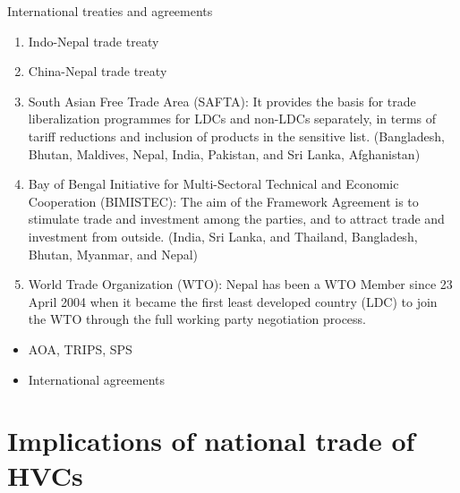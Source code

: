 \documentclass[12pt,ignorenonframetext,aspectratio=169]{beamer}
\providecommand{\tightlist}{%
  \setlength{\itemsep}{0pt}\setlength{\parskip}{0pt}}
\begin{document}
\begin{frame}{International treaties and agreements}
\protect\hypertarget{international-treaties-and-agreements}{}
\begin{enumerate}
\tightlist
\item
  Indo-Nepal trade treaty
\item
  China-Nepal trade treaty
\item
  South Asian Free Trade Area (SAFTA): It provides the basis for trade
  liberalization programmes for LDCs and non-LDCs separately, in terms
  of tariff reductions and inclusion of products in the sensitive list.
  (Bangladesh, Bhutan, Maldives, Nepal, India, Pakistan, and Sri Lanka,
  Afghanistan)
\item
  Bay of Bengal Initiative for Multi-Sectoral Technical and Economic
  Cooperation (BIMISTEC): The aim of the Framework Agreement is to
  stimulate trade and investment among the parties, and to attract trade
  and investment from outside. (India, Sri Lanka, and Thailand,
  Bangladesh, Bhutan, Myanmar, and Nepal)
\item
  World Trade Organization (WTO): Nepal has been a WTO Member since 23
  April 2004 when it became the first least developed country (LDC) to
  join the WTO through the full working party negotiation process.
\end{enumerate}

\begin{itemize}
\tightlist
\item
  AOA, TRIPS, SPS
\item
  International agreements
\end{itemize}
\end{frame}

\hypertarget{implications-of-national-trade-of-hvcs}{%
\section{Implications of national trade of
HVCs}\label{implications-of-national-trade-of-hvcs}}
\end{document}
